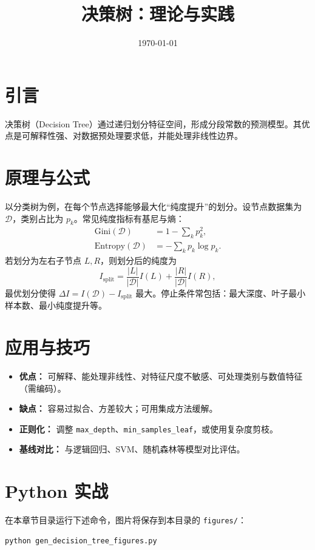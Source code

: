 \documentclass[UTF8,zihao=-4]{ctexart}
\title{决策树：理论与实践}
\author{}
\date{\today}
\begin{document}
\maketitle
\tableofcontents


\section{引言}
决策树（Decision Tree）通过递归划分特征空间，形成分段常数的预测模型。其优点是可解释性强、对数据预处理要求低，并能处理非线性边界。

\section{原理与公式}
以分类树为例，在每个节点选择能够最大化“纯度提升”的划分。设节点数据集为 $\mathcal{D}$，类别占比为 $p_k$。常见纯度指标有基尼与熵：
\begin{align}
\mathrm{Gini}(\mathcal{D}) &= 1 - \sum_k p_k^2,\\
\mathrm{Entropy}(\mathcal{D}) &= -\sum_k p_k \log p_k.
\end{align}
若划分为左右子节点 $L,R$，则划分后的纯度为
\begin{equation}
I_{\mathrm{split}} = \frac{|L|}{|\mathcal{D}|} I(L) + \frac{|R|}{|\mathcal{D}|} I(R),
\end{equation}
最优划分使得 $\Delta I = I(\mathcal{D}) - I_{\mathrm{split}}$ 最大。停止条件常包括：最大深度、叶子最小样本数、最小纯度提升等。

\section{应用与技巧}
\begin{itemize}
  \item \textbf{优点：} 可解释、能处理非线性、对特征尺度不敏感、可处理类别与数值特征（需编码）。
  \item \textbf{缺点：} 容易过拟合、方差较大；可用集成方法缓解。
  \item \textbf{正则化：} 调整 \texttt{max\_depth}、\texttt{min\_samples\_leaf}，或使用复杂度剪枝。
  \item \textbf{基线对比：} 与逻辑回归、SVM、随机森林等模型对比评估。
\end{itemize}

\section{Python 实战}
在本章节目录运行下述命令，图片将保存到本目录的 \texttt{figures/}：
\begin{lstlisting}[style=code,caption={生成决策树配图},label={lst:genfigs_dt_cn}]
python gen_decision_tree_figures.py
\end{lstlisting}
\end{document}
